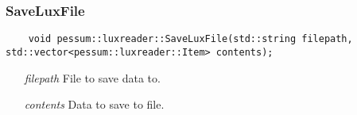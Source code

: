 \documentclass{subfiles}
\begin{document}
\newpage
\subsubsection{SaveLuxFile}
\begin{lstlisting}
	void pessum::luxreader::SaveLuxFile(std::string filepath, std::vector<pessum::luxreader::Item> contents);
\end{lstlisting}
\begin{enumerate}
	\item[\emph{filepath}] File to save data to.
	\item[\emph{contents}] Data to save to file.
\end{enumerate}
\begin{lstlisting}

\end{lstlisting}
\newpage
\end{document}
